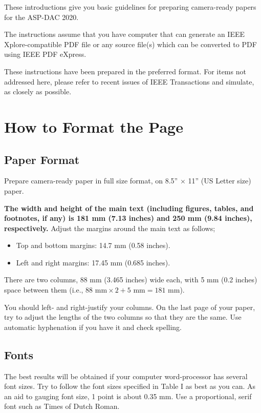\documentclass[conference]{IEEEtran}
\begin{document}
These introductions give you basic guidelines for preparing 
camera-ready papers for the ASP-DAC 2020.

The instructions assume that you have computer that can generate an 
IEEE Xplore-compatible PDF file or any source file(s) which can be 
converted to PDF using IEEE PDF eXpress. 

These instructions have been prepared in the preferred format. For items
not addressed here, please refer to recent issues of IEEE Transactions
and simulate, as closely as possible.

\section{How to Format the Page}

\subsection{Paper Format} 
Prepare camera-ready paper in full size format, on 8.5'' $\times$ 11'' 
(US Letter size) paper.

{\bf The width and height of the main text (including figures, tables, and 
	footnotes, if any) is 181 mm (7.13 inches) and 250 mm (9.84 inches), 
	respectively.}  Adjust the margins around the main text as follows;

\begin{itemize}
	\item Top and bottom margins: 14.7 mm (0.58 inches).
	\item Left and right margins: 17.45 mm (0.685 inches).
\end{itemize}

There are two columns, 88 mm (3.465 inches) wide each, with 5 mm (0.2 inches) 
space between them (i.e., $88\mbox{ mm}\times2+5\mbox{ mm}=181\mbox{ mm}$).

You should left- and right-justify your columns. On the last page of
your paper, try to adjust the lengths of the two columns so that they
are the same. Use automatic hyphenation if you have it and check
spelling.


\subsection{Fonts}
The best results will be obtained if your computer word-processor has
several font sizes. Try to follow the font sizes specified in Table I as
best as you can. As an aid to gauging font size, 1 point is about
0.35 mm. Use a proportional, serif font such as Times of Dutch Roman.
\end{document}
